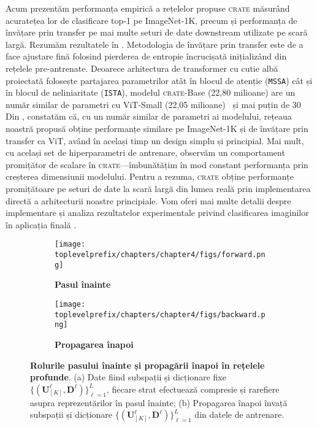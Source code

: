 \documentclass[../../book-main_ro.tex]{subfiles}
\begin{document}
Acum prezentăm performanța empirică a rețelelor propuse \textsc{crate} măsurând acuratețea lor de clasificare top-1 pe ImageNet-1K, precum și performanța de învățare prin transfer pe mai multe seturi de date downstream utilizate pe scară largă.
Rezumăm rezultatele în . Metodologia de învățare prin transfer este de a face ajustare fină folosind pierderea de entropie încrucișată inițializând din rețelele pre-antrenate.
Deoarece arhitectura de transformer cu cutie albă proiectată folosește partajarea parametrilor atât în blocul de atenție (\texttt{MSSA}) cât și în blocul de neliniaritate (\texttt{ISTA}), modelul \textsc{crate}{-Base} (22,80 milioane)
are un număr similar de parametri cu ViT-Small (22,05 milioane)~\cite{dosovitskiy2020image} și mai puțin de 30%
Din , constatăm că, cu un număr similar de parametri ai modelului, rețeaua noastră propusă obține performanțe similare pe ImageNet-1K și de învățare prin transfer ca ViT, având în același timp un design simplu și principial. Mai mult, cu același set de hiperparametri de antrenare, observăm un comportament promițător de scalare în \textsc{crate}---îmbunătățim în mod constant performanța prin creșterea dimensiunii modelului. Pentru a rezuma, \textsc{crate} obține performanțe promițătoare pe seturi de date la scară largă din lumea reală prin implementarea directă a arhitecturii noastre principiale. Vom oferi mai multe detalii despre implementare și analiza rezultatelor experimentale privind clasificarea imaginilor în aplicația finală .

\begin{figure}[t]
    \begin{subfigure}[t]{0.48\textwidth}
        \centering
        \texttt{[image: \\toplevelprefix/chapters/chapter4/figs/forward.png]}
        \caption{\bf Pasul înainte}
    \end{subfigure}
    \hfill
    \begin{subfigure}[t]{0.48\textwidth}
        \centering
        \texttt{[image: \\toplevelprefix/chapters/chapter4/figs/backward.png]}
        \caption{\bf Propagarea înapoi}
    \end{subfigure}
    \caption{\small {\bf Rolurile pasului înainte și propagării înapoi în rețelele profunde}. (a) Date fiind subspații și dicționare fixe $\{(\bm U_{[K]}^{\ell}, \bm D^{\ell})\}_{\ell=1}^L$, fiecare strat efectuează compresie și rarefiere asupra reprezentărilor în pasul înainte; (b) Propagarea înapoi învață subspații și dicționare $\{(\bm U_{[K]}^{\ell}, \bm D^{\ell})\}_{\ell=1}^L$ din datele de antrenare.}
    \label{fig:forward-backward}
\end{figure}
\end{document}
